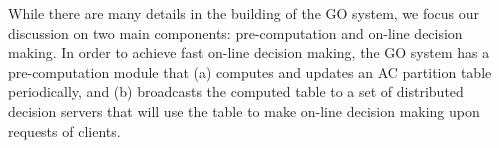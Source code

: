 
\label{sec:eval}

\begin{figure}[t!]
\centering
{}
\label{fig:perf-impr}
\end{figure}



\label{sec:impl}

While there are many details in the building of the GO system, we focus our discussion on two main components: pre-computation and on-line decision making. In order to achieve fast on-line decision making, the GO system has a pre-computation module that (a) computes and updates an AC partition table periodically, and (b) broadcasts the computed table to a set of distributed decision servers that will use the table to make on-line decision making upon requests of clients. 

